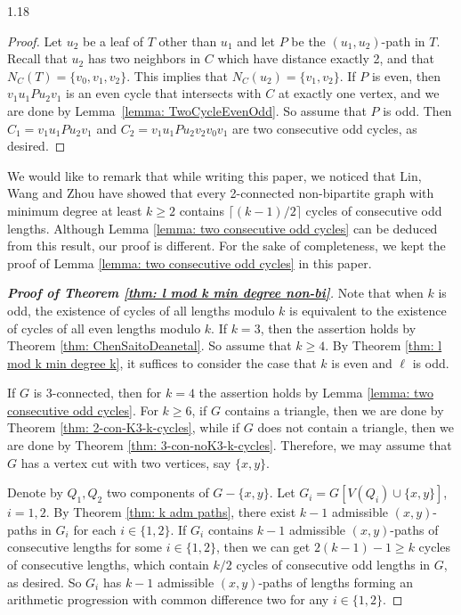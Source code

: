 \documentclass[10pt]{article}
\begin{document}
\begin{spacing}{1.18}
\begin{proof}
    Let $u_2$ be a leaf of $T$ other than $u_1$ and let $P$ be the $(u_1,u_2)$-path in $T$. Recall that $u_2$ has two neighbors in $C$ which have distance exactly 2, and that $N_C(T)=\{v_0,v_1,v_2\}$. This implies that $N_C(u_2)=\{v_1,v_2\}$. If $P$ is even, then $v_1u_1Pu_2v_1$ is an even cycle that intersects with $C$ at exactly one vertex, and we are done by Lemma~\ref{lemma: TwoCycleEvenOdd}. So assume that $P$ is odd. Then $C_1=v_1u_1Pu_2v_1$ and $C_2=v_1u_1Pu_2v_2v_0v_1$ are two consecutive odd cycles, as desired.     
\end{proof}

    We would like to remark that while writing this paper, we noticed that Lin, Wang and Zhou \cite{LWZ24} have showed that every 2-connected non-bipartite graph with minimum degree at least $k\geqslant 2$ contains $\lceil(k-1)/2\rceil$ cycles of consecutive odd lengths. Although Lemma \ref{lemma: two consecutive odd cycles} can be deduced from this result, our proof is different. For the sake of completeness, we kept the proof of Lemma \ref{lemma: two consecutive odd cycles} in this paper.


\begin{proof}[\bf Proof of Theorem \ref{thm: l mod k min degree non-bi}]
    Note that when $k$ is odd, the existence of cycles of all lengths modulo $k$ is equivalent to the existence of cycles of all even lengths modulo $k$. If $k=3$, then the assertion holds by Theorem \ref{thm: ChenSaitoDeanetal}. So assume that $k\geqslant 4$. By Theorem \ref{thm: l mod k min degree k}, it suffices to consider the case that $k$ is even and $\ell$ is odd. 
    
    If $G$ is 3-connected, then for $k=4$ the assertion holds by Lemma \ref{lemma: two consecutive odd cycles}. For $k \geqslant 6$, if $G$ contains a triangle, then we are done by Theorem \ref{thm: 2-con-K3-k-cycles}, while if $G$ does not contain a triangle, then we are done by Theorem \ref{thm: 3-con-noK3-k-cycles}. Therefore, we may assume that $G$ has a vertex cut with two vertices, say $\{x,y\}$.
    
    Denote by $Q_1,Q_2$ two components of $G-\{x,y\}$. Let $G_i=G[V(Q_i)\cup \{x,y\}]$, $i=1,2$. By Theorem \ref{thm: k adm paths}, there exist $k-1$ admissible $(x,y)$-paths in $G_i$ for each $i\in \{1,2\}$. If $G_i$ contains $k-1$ admissible $(x,y)$-paths of consecutive lengths for some $i\in \{1,2\}$, then we can get $2(k-1)-1\geqslant k$ cycles of consecutive lengths, which contain $k/2$ cycles of consecutive odd lengths in $G$, as desired. So $G_i$ has $k-1$ admissible $(x,y)$-paths of lengths forming an arithmetic progression with common difference two for any $i\in \{1,2\}$. 
    

\end{proof}
\end{spacing}
\end{document}
